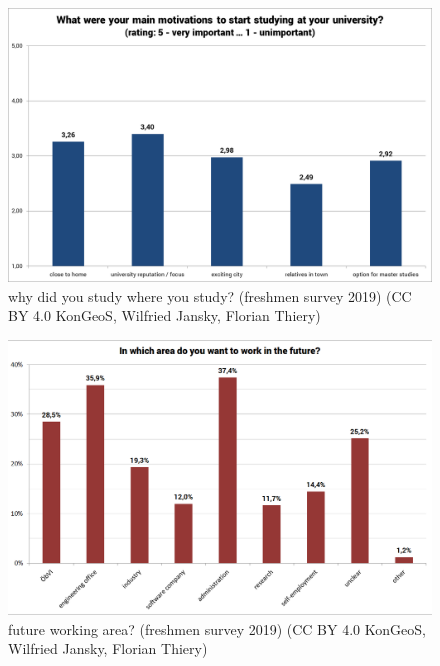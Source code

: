 \documentclass[a4paper]{article}
\begin{document}
\begin{figure}[!ht]
\begin{center}
\includegraphics[width=12cm]{wg-ys2.png}
\caption{why did you study where you study? (freshmen survey 2019) (CC BY 4.0 KonGeoS, Wilfried Jansky, Florian Thiery)}
\label{Abb5}
\end{center}
\end{figure}

\begin{figure}[!ht]
\begin{center}
\includegraphics[width=12cm]{wg-ys3.png}
\caption{future working area? (freshmen survey 2019) (CC BY 4.0 KonGeoS, Wilfried Jansky, Florian Thiery)}
\label{Abb6}
\end{center}
\end{figure}
\end{document}
